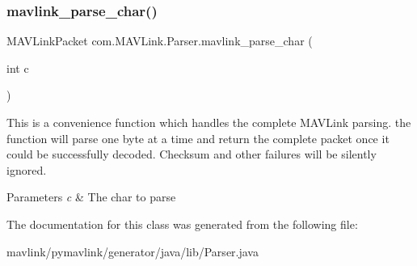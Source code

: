 \subsubsection{\texorpdfstring{mavlink\+\_\+parse\+\_\+char()}{mavlink\_parse\_char()}}
{\footnotesize\ttfamily M\+A\+V\+Link\+Packet com.\+M\+A\+V\+Link.\+Parser.\+mavlink\+\_\+parse\+\_\+char (\begin{DoxyParamCaption}\item[{int}]{c }\end{DoxyParamCaption})\hspace{0.3cm}{\ttfamily [inline]}}

This is a convenience function which handles the complete M\+A\+V\+Link parsing. the function will parse one byte at a time and return the complete packet once it could be successfully decoded. Checksum and other failures will be silently ignored.


\begin{DoxyParams}{Parameters}
{\em c} & The char to parse \\
\hline
\end{DoxyParams}


The documentation for this class was generated from the following file\+:\begin{DoxyCompactItemize}
\item 
mavlink/pymavlink/generator/java/lib/Parser.\+java\end{DoxyCompactItemize}
